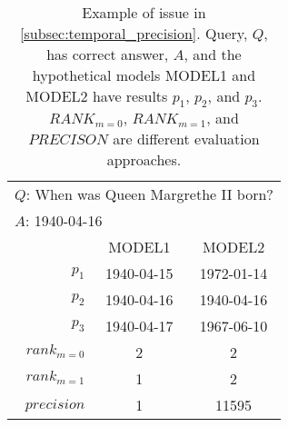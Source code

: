 \begin{table}[htb]
\centering
\begin{minipage}{0.95\columnwidth}
\centering
\caption{Example of issue in \autoref{subsec:temporal_precision}. Query, $Q$, has correct answer, $A$, and the hypothetical models \textsc{MODEL1} and \textsc{MODEL2} have results $p_1$, $p_2$, and $p_3$. \textsc{$RANK_{m=0}$}, \textsc{$RANK_{m=1}$}, and \textsc{$PRECISON$} are different evaluation approaches.}
\begin{tabular}{rcc}
\multicolumn{3}{l}{$Q$: When was Queen Margrethe II born?} \\
\multicolumn{3}{l}{$A$: 1940-04-16} \vspace{2mm} \\
\hline
{} & \textsc{MODEL1} & \textsc{MODEL2} \\
\hline
$p_1$ & 1940-04-15 & 1972-01-14 \\
$p_2$ & 1940-04-16 & 1940-04-16 \\
$p_3$ & 1940-04-17 & 1967-06-10 \\
\hline
\textsc{$rank_{m=0}$} & 2 & 2 \\
\textsc{$rank_{m=1}$} & 1 & 2 \\
\textsc{$precision$} & 1 & 11595\\
\hline
\end{tabular}
\label{tab:temporal_precision}
\end{minipage}
\end{table}